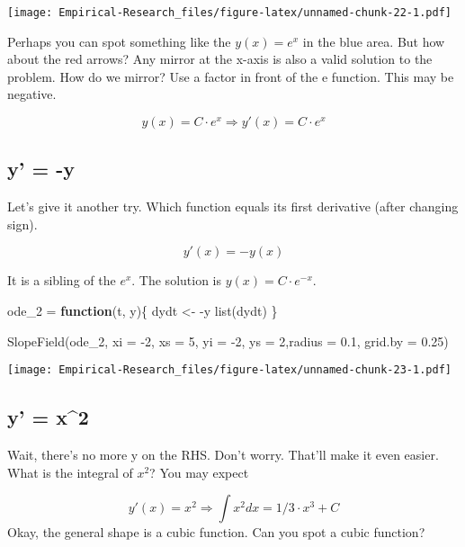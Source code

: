 \documentclass[
]{book}
\newenvironment{Shaded}{\begin{snugshade}}{\end{snugshade}}
\newcommand{\AttributeTok}[1]{\textcolor[rgb]{0.77,0.63,0.00}{#1}}
\newcommand{\ControlFlowTok}[1]{\textcolor[rgb]{0.13,0.29,0.53}{\textbf{#1}}}
\newcommand{\DecValTok}[1]{\textcolor[rgb]{0.00,0.00,0.81}{#1}}
\newcommand{\FloatTok}[1]{\textcolor[rgb]{0.00,0.00,0.81}{#1}}
\newcommand{\FunctionTok}[1]{\textcolor[rgb]{0.00,0.00,0.00}{#1}}
\newcommand{\NormalTok}[1]{#1}
\newcommand{\OtherTok}[1]{\textcolor[rgb]{0.56,0.35,0.01}{#1}}
\newcommand{\SpecialCharTok}[1]{\textcolor[rgb]{0.00,0.00,0.00}{#1}}
\begin{document}
\texttt{[image: Empirical-Research\_files/figure-latex/unnamed-chunk-22-1.pdf]}

Perhaps you can spot something like the \(y(x) = e^x\) in the blue area. But how about the red arrows? Any mirror at the x-axis is also a valid solution to the problem. How do we mirror? Use a factor in front of the e function. This may be negative.

\[y(x) = C \cdot e^x \Rightarrow y'(x) = C \cdot e^x \]

\hypertarget{y--y}{%
\subsection{y' = -y}\label{y--y}}

Let's give it another try. Which function equals its first derivative (after changing sign).

\[y'(x) = -y(x)\]

It is a sibling of the \(e^x\). The solution is \(y(x) = C \cdot e^{-x}\).

\begin{Shaded}
\begin{Highlighting}[]
\NormalTok{ode\_2 }\OtherTok{=} \ControlFlowTok{function}\NormalTok{(t, y)\{}
\NormalTok{  dydt }\OtherTok{\textless{}{-}} \SpecialCharTok{{-}}\NormalTok{y}
  \FunctionTok{list}\NormalTok{(dydt)}
\NormalTok{\}}

\FunctionTok{SlopeField}\NormalTok{(ode\_2, }\AttributeTok{xi =} \SpecialCharTok{{-}}\DecValTok{2}\NormalTok{, }\AttributeTok{xs =} \DecValTok{5}\NormalTok{, }\AttributeTok{yi =} \SpecialCharTok{{-}}\DecValTok{2}\NormalTok{, }\AttributeTok{ys =} \DecValTok{2}\NormalTok{,}\AttributeTok{radius =} \FloatTok{0.1}\NormalTok{, }\AttributeTok{grid.by =} \FloatTok{0.25}\NormalTok{)}
\end{Highlighting}
\end{Shaded}

\texttt{[image: Empirical-Research\_files/figure-latex/unnamed-chunk-23-1.pdf]}

\hypertarget{y-x2}{%
\subsection{y' = x\^{}2}\label{y-x2}}

Wait, there's no more y on the RHS. Don't worry. That'll make it even easier. What is the integral of \(x^2\)? You may expect

\[y'(x) = x^2 \Rightarrow \int x^2 dx = 1/3 \cdot x^3 + C\]
Okay, the general shape is a cubic function. Can you spot a cubic function?
\end{document}
